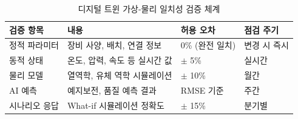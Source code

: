 \begin{table}[htbp]
\centering
\caption{디지털 트윈 가상-물리 일치성 검증 체계}
\label{tab:19_dt_validation}
\begin{tabularx}{\textwidth}{p{2.5cm}Xp{3cm}p{2cm}}
\toprule
\textbf{검증 항목} & \textbf{내용} & \textbf{허용 오차} & \textbf{점검 주기} \\
\midrule
정적 파라미터 & 장비 사양, 배치, 연결 정보 & 0\% (완전 일치) & 변경 시 즉시 \\
동적 상태 & 온도, 압력, 속도 등 실시간 값 & $\pm$ 5\% & 실시간 \\
물리 모델 & 열역학, 유체 역학 시뮬레이션 & $\pm$ 10\% & 월간 \\
AI 예측 & 예지보전, 품질 예측 결과 & RMSE 기준 & 주간 \\
시나리오 응답 & What-if 시뮬레이션 정확도 & $\pm$ 15\% & 분기별 \\
\bottomrule
\end{tabularx}
\end{table}

